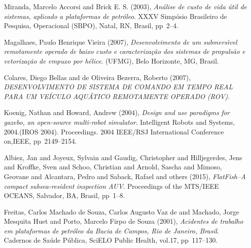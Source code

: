\begin{thebibliography}{999}

Miranda, Marcelo Accorsi and Brick E. S. (2003),  
{\it An{\'a}lise de custo de vida {\'u}til de sistemas, aplicado a plataformas de petr{\'o}leo}.  
XXXV Simp{\'o}sio Brasileiro de Pesquisa, Operacional (SBPO), Natal, RN, Brasil, pp~2--4.

Magalhaes, Paulo Henrique Vieira (2007),  
{\it Desenvolvimento de um submers{\'\i}vel remotamente operado de baixo custo e caracteriza{\c{c}}{\~a}o dos sistemas de propuls{\~a}o e vetoriza{\c{c}}{\~a}o de empuxo por h{\'e}lice}.  
(UFMG), Belo Horizonte, MG, Brasil.

Colares, Diego Bellas and de Oliveira Bezerra, Roberto (2007),  
{\it DESENVOLVIMENTO DE SISTEMA DE COMANDO EM TEMPO REAL PARA UM VE{\'I}CULO AQU{\'A}TICO REMOTAMENTE OPERADO (ROV)}.  

Koenig, Nathan and Howard, Andrew (2004),  
{\it Design and use paradigms for gazebo, an open-source multi-robot simulator}.  
Intelligent Robots and Systems, 2004.(IROS 2004). Proceedings. 2004 IEEE/RSJ International Conference on,IEEE, pp~2149--2154.

Albiez, Jan and Joyeux, Sylvain and Gaudig, Christopher and Hilljegerdes, Jens and Kroffke, Sven and Schoo, Christian and Arnold, Sascha and Mimoso, Geovane and Alcantara, Pedro and Saback, Rafael and others (2015),  
{\it FlatFish--A compact subsea-resident inspection AUV}.  
Proceedings of the MTS/IEEE OCEANS, Salvador, BA, Brasil, pp~1--8.



Freitas, Carlos Machado de Souza, Carlos Augusto Vaz de and Machado, Jorge Mesquita Huet and Porto, Marcelo Firpo de Souza (2001),  
{\it Acidentes de trabalho em plataformas de petr{\'o}leo da Bacia de Campos, Rio de Janeiro, Brasil}.  
Cadernos de Sa{\'u}de P{\'u}blica, SciELO Public Health, vol.17, pp~117--130.




\end{thebibliography}




